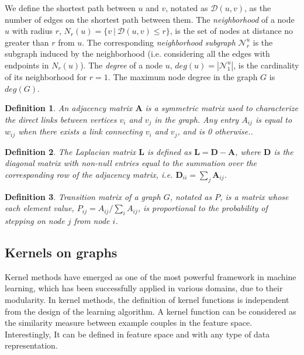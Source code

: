 \documentclass[review]{elsarticle}
\newtheorem{definition}{Definition}
\begin{document}
We define the shortest path between $u$ and $v$, notated as $\mathcal{D}(u,v)$, as the number of edges on the shortest path between them. The \textit{neighborhood} of a node $u$ with radius $r$, $N_r(u) = \lbrace v\ |\ \mathcal{D}(u,v) \leq r \rbrace$, is the set of nodes at distance no greater than $r$ from $u$. The corresponding \textit{neighborhood subgraph} $\mathcal{N}_{r}^{u}$ is the  subgraph induced by the neighborhood (i.e. considering all the edges with endpoints in $N_r(u)$). The \textit{degree} of a node $u$, $deg(u) = |\mathcal{N}_{1}^{u}|$, is the cardinality of its neighborhood for $r=1$. The maximum node degree in the graph $G$ is $deg(G)$.

\begin{definition}{}
\textit{An adjacency matrix $\textbf{A}$ is a symmetric matrix used to characterize the direct links between vertices $v_{i}$ and $v_{j}$ in the graph. Any entry $A_{ij}$ is equal to $w_{ij}$ when there exists a link connecting $v_{i}$ and $v_{j}$, and is 0 otherwise.}. 
\end{definition}

\begin{definition}{}
\textit{The Laplacian matrix $\textbf{L}$ is defined as $\textbf{L} = \textbf{D}-\textbf{A}$, where $\textbf{D}$ is the diagonal matrix with non-null entries equal to the summation over the corresponding row of the adjacency matrix, i.e. $\textbf{D}_{ii}=\sum_j \textbf{A}_{ij}$.}
\end{definition}

\begin{definition}{}
\textit{Transition matrix of a graph $G$, notated as $P$, is a matrix whose each element value, $P_{ij} = A_{ij}/\sum_{i}^{}A_{ij}$, is proportional to the probability of stepping on node $j$ from node $i$.}
\end{definition}

\subsection{Kernels on graphs}
Kernel methods have emerged as one of the most powerful framework in machine learning, which has been successfully applied in various domains, due to their modularity. In kernel methods, the definition of kernel functions is independent from the design of the learning algorithm. A kernel function can be  considered as the similarity measure between example couples in the feature space. Interestingly, It can be defined in feature space and with any type of data representation. 
\end{document}
